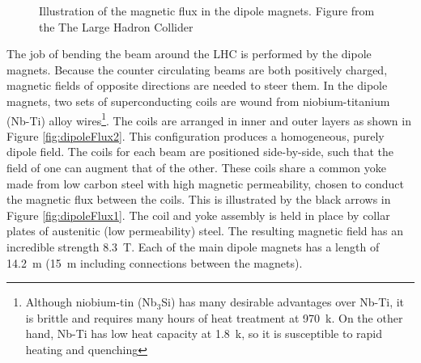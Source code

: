 \begin{figure}[h!]
\captionsetup[subfigure]{position=b}
\centering
{}
\caption{Illustration of the magnetic flux in the dipole magnets. Figure from the The Large Hadron Collider \cite{lyndon}}
\label{fig:dipoleFlux}
\end{figure}

The job of bending the beam around the LHC is performed by the dipole magnets.
Because the counter circulating beams are both positively charged, magnetic fields of opposite directions are needed to steer them.
In the dipole magnets, two sets of superconducting coils are wound from niobium-titanium (Nb-Ti) alloy wires\footnote{Although niobium-tin (Nb$_3$Si) has many desirable advantages over Nb-Ti, it is brittle and requires many hours of heat treatment at 970~k. On the other hand, Nb-Ti has low heat capacity at 1.8~k, so it is susceptible to rapid heating and quenching}.
The coils are arranged in inner and outer layers as shown in Figure \ref{fig:dipoleFlux2}.
This configuration produces a homogeneous, purely dipole field.
The coils for each beam are positioned side-by-side, such that the field of one can augment that of the other.
These coils share a common yoke made from low carbon steel with high magnetic permeability, chosen to conduct the magnetic flux between the coils.
This is illustrated by the black arrows in Figure \ref{fig:dipoleFlux1}.
The coil and yoke assembly is held in place by collar plates of austenitic (low permeability) steel.
The resulting magnetic field has an incredible strength 8.3~T.
Each of the main dipole magnets has a length of 14.2~m (15~m including connections between the magnets).

